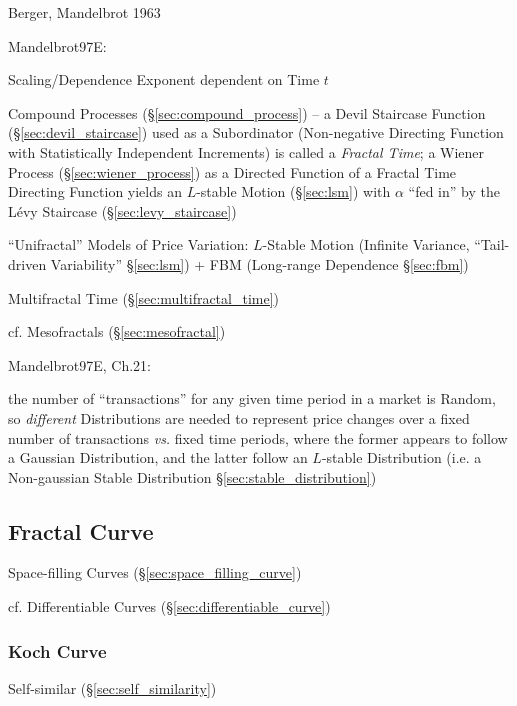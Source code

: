 Berger, Mandelbrot 1963

Mandelbrot97E:

Scaling/Dependence Exponent dependent on Time $t$

Compound Processes (\S\ref{sec:compound_process}) -- a Devil Staircase Function
(\S\ref{sec:devil_staircase}) used as a Subordinator (Non-negative Directing
Function with Statistically Independent Increments) is called a \emph{Fractal
  Time}; a Wiener Process (\S\ref{sec:wiener_process}) as a Directed Function of
a Fractal Time Directing Function yields an $L$-stable Motion (\S\ref{sec:lsm})
with $\alpha$ ``fed in'' by the L\'evy Staircase (\S\ref{sec:levy_staircase})

``Unifractal'' Models of Price Variation: $L$-Stable Motion
(Infinite Variance, ``Tail-driven Variability'' \S\ref{sec:lsm}) + FBM
(Long-range Dependence \S\ref{sec:fbm})

\fist Multifractal Time (\S\ref{sec:multifractal_time})

cf. Mesofractals (\S\ref{sec:mesofractal})

Mandelbrot97E, Ch.21:

the number of ``transactions'' for any given time period in a market is Random,
so \emph{different} Distributions are needed to represent price changes over a
fixed number of transactions \emph{vs.} fixed time periods, where the former
appears to follow a Gaussian Distribution, and the latter follow an $L$-stable
Distribution (i.e. a Non-gaussian Stable Distribution
\S\ref{sec:stable_distribution})



\subsection{Fractal Curve}\label{sec:fractal_curve}

Space-filling Curves (\S\ref{sec:space_filling_curve})

cf. Differentiable Curves (\S\ref{sec:differentiable_curve})



\subsubsection{Koch Curve}\label{sec:koch_curve}

Self-similar (\S\ref{sec:self_similarity})



